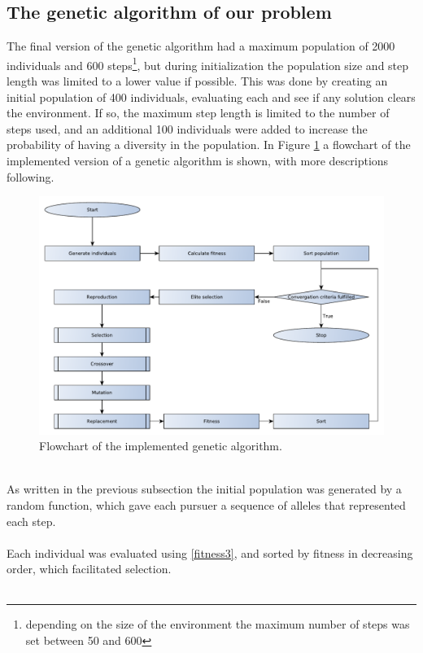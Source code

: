 \subsection{The genetic algorithm of our problem}
The final version of the genetic algorithm had a maximum population of 2000 individuals and 600 steps\footnote{depending on the size of the environment the maximum number of steps was set between 50 and 600 }, but during initialization the population size and step length was limited to a lower value if possible. This was done by creating an initial population of 400 individuals, evaluating each and see if any solution clears the environment. If so, the maximum step length is limited to the number of steps used, and an additional 100 individuals were added to increase the probability of having a diversity in the population. In Figure \ref{GeneticFlowChart-algorithm} a flowchart of the implemented version of a genetic algorithm is shown, with more descriptions following.
\begin{figure}[!h]
	\centering
	\includegraphics[width=\textwidth]{chapter_4_methods/GeneticFlowChart-Algorithm}
	\caption[Flowchart of the implemented genetic algorithm]
	{Flowchart of the implemented genetic algorithm.}
	\label{GeneticFlowChart-algorithm}
\end{figure}
\\As written in the previous subsection the initial population was generated by a random function, which gave each pursuer a sequence of alleles that represented each step.\\\\
Each individual was evaluated using \eqref{fitness3}, and sorted by fitness in decreasing order, which facilitated selection.\\\\
